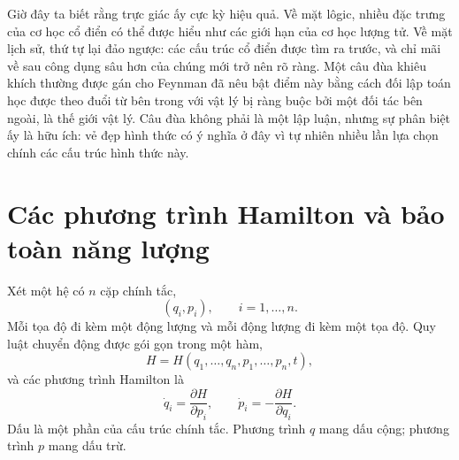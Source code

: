 Giờ đây ta biết rằng trực giác ấy cực kỳ hiệu quả. Về mặt lôgic, nhiều đặc trưng của cơ học cổ điển có thể được hiểu như các giới hạn của cơ học lượng tử. Về mặt lịch sử, thứ tự lại đảo ngược: các cấu trúc cổ điển được tìm ra trước, và chỉ mãi về sau công dụng sâu hơn của chúng mới trở nên rõ ràng. Một câu đùa khiêu khích thường được gán cho Feynman đã nêu bật điểm này bằng cách đối lập toán học được theo đuổi từ bên trong với vật lý bị ràng buộc bởi một đối tác bên ngoài, là thế giới vật lý. Câu đùa không phải là một lập luận, nhưng sự phân biệt ấy là hữu ích: vẻ đẹp hình thức có ý nghĩa ở đây vì tự nhiên nhiều lần lựa chọn chính các cấu trúc hình thức này.

\begin{classroomqa}\end{classroomqa}

\section{Các phương trình Hamilton và bảo toàn năng lượng}

Xét một hệ có \(n\) cặp chính tắc, \begin{equation}
  (q_i,p_i),\qquad i=1,\ldots,n.
  \label{eq:l7-canonical-pairs}
\end{equation} Mỗi tọa độ đi kèm một động lượng và mỗi động lượng đi kèm một tọa độ. Quy luật chuyển động được gói gọn trong một hàm, \begin{equation}
  H=H(q_1,\ldots,q_n,p_1,\ldots,p_n,t),
  \label{eq:l7-hamiltonian}
\end{equation} và các phương trình Hamilton là \begin{equation}
  \boxed{
  \dot q_i=\frac{\partial H}{\partial p_i},
  \qquad
  \dot p_i=-\frac{\partial H}{\partial q_i}.}
  \label{eq:l7-hamilton-equations}
\end{equation} Dấu là một phần của cấu trúc chính tắc. Phương trình \(q\) mang dấu cộng; phương trình \(p\) mang dấu trừ.

